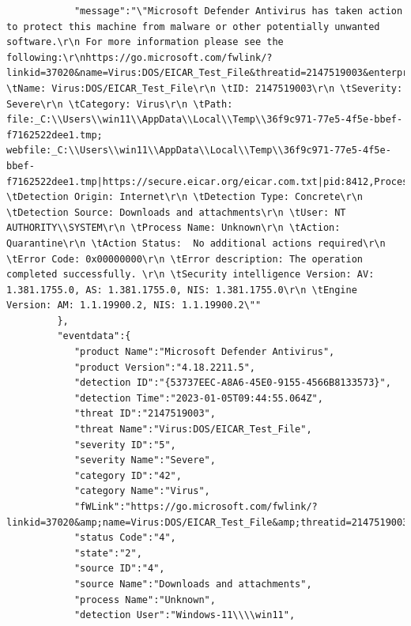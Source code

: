 \begin{itemize}
\begin{verbatim}
            "message":"\"Microsoft Defender Antivirus has taken action to protect this machine from malware or other potentially unwanted software.\r\n For more information please see the following:\r\nhttps://go.microsoft.com/fwlink/?linkid=37020&name=Virus:DOS/EICAR_Test_File&threatid=2147519003&enterprise=0\r\n \tName: Virus:DOS/EICAR_Test_File\r\n \tID: 2147519003\r\n \tSeverity: Severe\r\n \tCategory: Virus\r\n \tPath: file:_C:\\Users\\win11\\AppData\\Local\\Temp\\36f9c971-77e5-4f5e-bbef-f7162522dee1.tmp; webfile:_C:\\Users\\win11\\AppData\\Local\\Temp\\36f9c971-77e5-4f5e-bbef-f7162522dee1.tmp|https://secure.eicar.org/eicar.com.txt|pid:8412,ProcessStart:133173854939240064\r\n \tDetection Origin: Internet\r\n \tDetection Type: Concrete\r\n \tDetection Source: Downloads and attachments\r\n \tUser: NT AUTHORITY\\SYSTEM\r\n \tProcess Name: Unknown\r\n \tAction: Quarantine\r\n \tAction Status:  No additional actions required\r\n \tError Code: 0x00000000\r\n \tError description: The operation completed successfully. \r\n \tSecurity intelligence Version: AV: 1.381.1755.0, AS: 1.381.1755.0, NIS: 1.381.1755.0\r\n \tEngine Version: AM: 1.1.19900.2, NIS: 1.1.19900.2\""
         },
         "eventdata":{
            "product Name":"Microsoft Defender Antivirus",
            "product Version":"4.18.2211.5",
            "detection ID":"{53737EEC-A8A6-45E0-9155-4566B8133573}",
            "detection Time":"2023-01-05T09:44:55.064Z",
            "threat ID":"2147519003",
            "threat Name":"Virus:DOS/EICAR_Test_File",
            "severity ID":"5",
            "severity Name":"Severe",
            "category ID":"42",
            "category Name":"Virus",
            "fWLink":"https://go.microsoft.com/fwlink/?linkid=37020&amp;name=Virus:DOS/EICAR_Test_File&amp;threatid=2147519003&amp;enterprise=0",
            "status Code":"4",
            "state":"2",
            "source ID":"4",
            "source Name":"Downloads and attachments",
            "process Name":"Unknown",
            "detection User":"Windows-11\\\\win11",

\end{verbatim}
\end{itemize}
